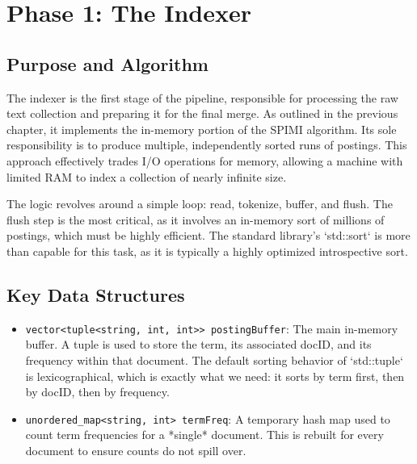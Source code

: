 \documentclass[11pt, a4paper]{report}
\begin{document}
\newpage
\chapter{Phase 1: The Indexer}

\section{Purpose and Algorithm}
The indexer is the first stage of the pipeline, responsible for processing the raw text collection and preparing it for the final merge. As outlined in the previous chapter, it implements the in-memory portion of the SPIMI algorithm. Its sole responsibility is to produce multiple, independently sorted runs of postings. This approach effectively trades I/O operations for memory, allowing a machine with limited RAM to index a collection of nearly infinite size.

The logic revolves around a simple loop: read, tokenize, buffer, and flush. The flush step is the most critical, as it involves an in-memory sort of millions of postings, which must be highly efficient. The standard library's `std::sort` is more than capable for this task, as it is typically a highly optimized introspective sort.

\section{Key Data Structures}
\begin{itemize}
    \item \lstinline{vector<tuple<string, int, int>> postingBuffer}: The main in-memory buffer. A tuple is used to store the term, its associated docID, and its frequency within that document. The default sorting behavior of `std::tuple` is lexicographical, which is exactly what we need: it sorts by term first, then by docID, then by frequency.
    \item \lstinline{unordered_map<string, int> termFreq}: A temporary hash map used to count term frequencies for a *single* document. This is rebuilt for every document to ensure counts do not spill over.
\end{itemize}
\end{document}
